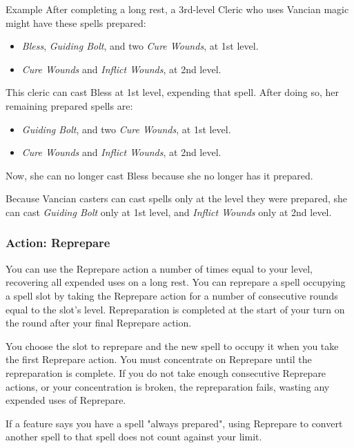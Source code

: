 \documentclass[letterpaper,twocolumn,openany,nodeprecatedcode]{dndbook}
\begin{document}
\begin{DndComment}{Example}
After completing a long rest, a 3rd-level Cleric who uses Vancian magic might have these spells prepared:

\begin{itemize}
\item \textit{Bless}, \textit{Guiding Bolt}, and two \textit{Cure Wounds}, at 1st level.
\item \textit{Cure Wounds} and \textit{Inflict Wounds}, at 2nd level.
\end{itemize}

\noindent This cleric can cast Bless at 1st level, expending that spell. After doing so, her remaining prepared spells are:

\begin{itemize}
\item \textit{Guiding Bolt}, and two \textit{Cure Wounds}, at 1st level.
\item \textit{Cure Wounds} and \textit{Inflict Wounds}, at 2nd level.
\end{itemize}

\noindent Now, she can no longer cast Bless because she no longer has it prepared. 

Because Vancian casters can cast spells only at the level they were prepared, she can cast \textit{Guiding Bolt} only at 1st level, and \textit{Inflict Wounds} only at 2nd level.
\end{DndComment}

\subsubsection{Action: Reprepare}
You can use the Reprepare action a number of times equal to your level, recovering all expended uses on a long rest. You can reprepare a spell occupying a spell slot by taking the Reprepare action for a number of consecutive rounds equal to the slot's level. Repreparation is completed at the start of your turn on the round after your final Reprepare action. 

You choose the slot to reprepare and the new spell to occupy it when you take the first Reprepare action. You must concentrate on Reprepare until the repreparation is complete. If you do not take enough consecutive Reprepare actions, or your concentration is broken, the repreparation fails, wasting any expended uses of Reprepare.

If a feature says you have a spell "always prepared", using Reprepare to convert another spell to that spell does not count against your limit.
\end{document}
